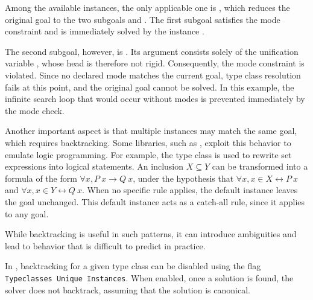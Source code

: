 Among the available instances, the only applicable one is , which
reduces the original goal to the two subgoals  and . The
first subgoal satisfies the mode constraint and is immediately solved by the
instance .

The second subgoal, however, is . Its argument consists solely of the
unification variable , whose head is therefore not rigid. Consequently,
the mode constraint is violated. Since no declared mode matches the current
goal, type class resolution fails at this point, and the original goal cannot be
solved. In this example, the infinite search loop that would occur without modes
is prevented immediately by the mode check.

Another important aspect is that multiple instances may match the same goal,
which requires backtracking. Some libraries, such as \stdpp{}, exploit this
behavior to emulate logic programming. For example, the type class
 is used to rewrite set expressions into logical statements. An
inclusion $X \subseteq Y$ can be transformed into a formula of the form %
$\forall x, P\ x \to Q\ x$, under the hypothesis that $\forall x, x \in X \leftrightarrow P\ x$
and $\forall x, x \in Y \leftrightarrow Q\ x$. When no %
specific rule applies, the default instance
 leaves the goal unchanged.
This default instance acts as a catch-all rule, since it applies to any goal.

While backtracking is useful in such patterns, it can introduce ambiguities and
lead to behavior that is difficult to predict in practice.

In \rocq{}, backtracking for a given type class can be disabled using the flag
\texttt{Typeclasses Unique Instances}. When enabled, once a solution is found,
the solver does not backtrack, assuming that the solution is canonical.





